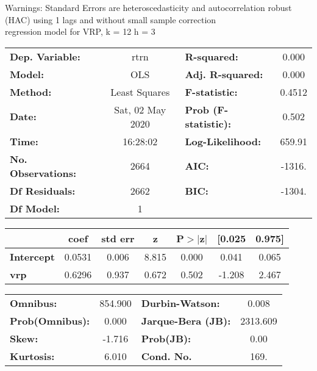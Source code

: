 Warnings: \newline
 [1] Standard Errors are heteroscedasticity and autocorrelation robust (HAC) using 1 lags and without small sample correction\\ 

regression model for VRP, k = 12 h = 3\begin{center}
\begin{tabular}{lclc}
\toprule
\textbf{Dep. Variable:}    &       rtrn       & \textbf{  R-squared:         } &     0.000   \\
\textbf{Model:}            &       OLS        & \textbf{  Adj. R-squared:    } &     0.000   \\
\textbf{Method:}           &  Least Squares   & \textbf{  F-statistic:       } &    0.4512   \\
\textbf{Date:}             & Sat, 02 May 2020 & \textbf{  Prob (F-statistic):} &    0.502    \\
\textbf{Time:}             &     16:28:02     & \textbf{  Log-Likelihood:    } &    659.91   \\
\textbf{No. Observations:} &        2664      & \textbf{  AIC:               } &    -1316.   \\
\textbf{Df Residuals:}     &        2662      & \textbf{  BIC:               } &    -1304.   \\
\textbf{Df Model:}         &           1      & \textbf{                     } &             \\
\bottomrule
\end{tabular}
\begin{tabular}{lcccccc}
                   & \textbf{coef} & \textbf{std err} & \textbf{z} & \textbf{P$> |$z$|$} & \textbf{[0.025} & \textbf{0.975]}  \\
\midrule
\textbf{Intercept} &       0.0531  &        0.006     &     8.815  &         0.000        &        0.041    &        0.065     \\
\textbf{vrp}       &       0.6296  &        0.937     &     0.672  &         0.502        &       -1.208    &        2.467     \\
\bottomrule
\end{tabular}
\begin{tabular}{lclc}
\textbf{Omnibus:}       & 854.900 & \textbf{  Durbin-Watson:     } &    0.008  \\
\textbf{Prob(Omnibus):} &   0.000 & \textbf{  Jarque-Bera (JB):  } & 2313.609  \\
\textbf{Skew:}          &  -1.716 & \textbf{  Prob(JB):          } &     0.00  \\
\textbf{Kurtosis:}      &   6.010 & \textbf{  Cond. No.          } &     169.  \\
\bottomrule
\end{tabular}
\end{center}

